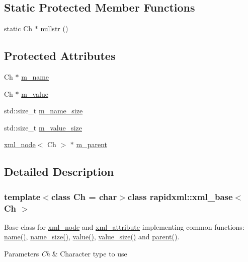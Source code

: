 \subsection*{Static Protected Member Functions}
\begin{DoxyCompactItemize}
\item 
static Ch $\ast$ \hyperlink{classrapidxml_1_1xml__base_ad96ff6b1e41dab3ff60b9bc4df769a75}{nullstr} ()
\end{DoxyCompactItemize}
\subsection*{Protected Attributes}
\begin{DoxyCompactItemize}
\item 
Ch $\ast$ \hyperlink{classrapidxml_1_1xml__base_afd9851ed43e14619db0d7075ef8e9e8a}{m\+\_\+name}
\item 
Ch $\ast$ \hyperlink{classrapidxml_1_1xml__base_a278a1ea63b0b70219b946cec47fa00ea}{m\+\_\+value}
\item 
std\+::size\+\_\+t \hyperlink{classrapidxml_1_1xml__base_a5a8c76a7274b4180213796422c4df76f}{m\+\_\+name\+\_\+size}
\item 
std\+::size\+\_\+t \hyperlink{classrapidxml_1_1xml__base_aa3a49d8ceddb8a8d7edb773a2226b89c}{m\+\_\+value\+\_\+size}
\item 
\hyperlink{classrapidxml_1_1xml__node}{xml\+\_\+node}$<$ Ch $>$ $\ast$ \hyperlink{classrapidxml_1_1xml__base_a90d5f660f078f66563fd7b2d8387ccb0}{m\+\_\+parent}
\end{DoxyCompactItemize}


\subsection{Detailed Description}
\subsubsection*{template$<$class Ch = char$>$class rapidxml\+::xml\+\_\+base$<$ Ch $>$}

Base class for \hyperlink{classrapidxml_1_1xml__node}{xml\+\_\+node} and \hyperlink{classrapidxml_1_1xml__attribute}{xml\+\_\+attribute} implementing common functions\+: \hyperlink{classrapidxml_1_1xml__base_a9a09739310469995db078ebd0da3ed45}{name()}, \hyperlink{classrapidxml_1_1xml__base_a7e7f98b3d01e1eab8dc1ca69aad9af84}{name\+\_\+size()}, \hyperlink{classrapidxml_1_1xml__base_adcdaccff61c665f039d9344e447b7445}{value()}, \hyperlink{classrapidxml_1_1xml__base_a9fcf201ed0915ac18dd43b0b5dcfaf32}{value\+\_\+size()} and \hyperlink{classrapidxml_1_1xml__base_a7f31ae930f93852830234db1ae59c4c4}{parent()}. 
\begin{DoxyParams}{Parameters}
{\em Ch} & Character type to use \\
\hline
\end{DoxyParams}



